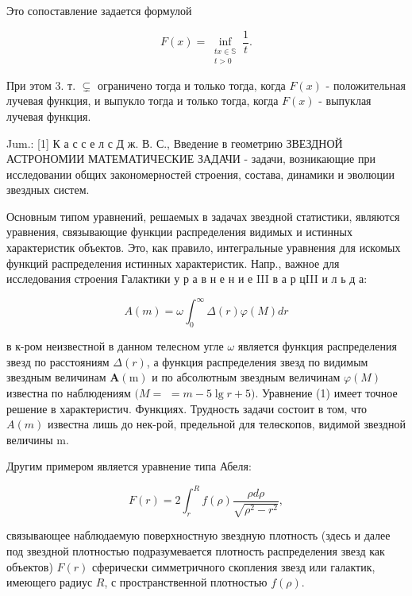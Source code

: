 \documentclass[10pt]{article}
\begin{document}
Это сопоставление задается формулой



\[

F(x)=\inf _{\substack{t x \in \mathbb{S} \\ t>0}} \frac{1}{t} .

\]



При этом 3. т. $\subsetneq$ ограничено тогда и только тогда, когда $F(x)$ - положительная лучевая функция, и выпукло тогда и только тогда, когда $F(x)$ - выпуклая лучевая функция.



Jum.: [1] К а с с е л с Д ж. В. С., Введение в геометрию ЗВЕЗДНОЙ АСТРОНОМИИ МАТЕМАТИЧЕСКИЕ ЗАДАЧИ - задачи, возникающие при исследовании общих закономерностей строения, состава, динамики и эволюции звездных систем.



Основным типом уравнений, решаемых в задачах звездной статистики, являются уравнения, связывающие функции распределения видимых и истинных характеристик объектов. Это, как правило, интегральные уравнения для искомых функций распределения истинных характеристик. Напр., важное для исследования строения Галактики у р а в н е н и е III в а р цIII и л ь д а:



\[

A(m)=\omega \int_{0}^{\infty} \Delta(r) \varphi(M) d r

\]



в к-ром неизвестной в данном телесном угле $\omega$ является функция распределения звезд по расстояниям $\Delta(r)$, а функция распределения звезд по видимым звездным величинам $\boldsymbol{A}(\mathrm{m})$ и по абсолютным звездным величинам $\varphi(M)$ известна по наблюдениям $(M=$ $=m-5 \lg r+5)$. Уравнение (1) имеет точное решение в характеристич. Функциях. Трудность задачи состоит в том, что $A(m)$ известна лишь до нек-рой, предельной для телөскопов, видимой звездной величины $\mathrm{m}$.



Другим примером является уравнение типа Абеля:



\[

F(r)=2 \int_{r}^{R} f(\rho) \frac{\rho d \rho}{\sqrt{\rho^{2}-r^{2}}},

\]



связывающее наблюдаемую поверхностную звездную плотность (здесь и далее под звездной плотностью подразумевается плотность распределения звезд как объектов) $F(r)$ сферически симметричного скопления звезд или галактик, имеющего радиус $R$, с пространственной плотностью $f(\rho)$.
\end{document}
